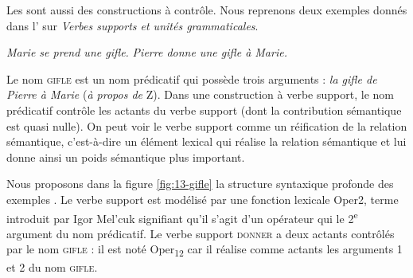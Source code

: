 Les  sont aussi des constructions à contrôle. Nous reprenons deux exemples donnés dans l’ sur \textit{Verbes supports et unités grammaticales}.

\ea\label{ex:13-gifle}
\ea \textit{Marie se prend une gifle.}
\ex \textit{Pierre donne une gifle à Marie.}\z\z

Le nom \textsc{gifle} est un nom prédicatif qui possède trois arguments : \textit{la gifle de Pierre à Marie} (\textit{à propos de} Z). Dans une construction à verbe support, le nom prédicatif contrôle les actants du verbe support (dont la contribution sémantique est quasi nulle). On peut voir le verbe support comme un réification de la relation sémantique, c’est-à-dire un élément lexical qui réalise la relation sémantique et lui donne ainsi un poids sémantique plus important.

Nous proposons dans la figure \ref{fig:13-gifle} la structure syntaxique profonde des exemples . Le verbe support  est modélisé par une fonction lexicale Oper2, terme introduit par Igor Mel’cuk signifiant qu’il s’agit d’un opérateur qui  le 2\textsuperscript{e} argument du nom prédicatif. Le verbe support \textsc{donner} a deux actants contrôlés par le nom \textsc{gifle} : il est noté Oper\textsubscript{12} car il réalise comme actants les arguments 1 et 2 du nom \textsc{gifle}.


